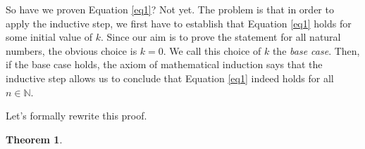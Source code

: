 \documentclass[12pt,a4paper]{article}
\newtheorem{theorem}{Theorem}[section]
\theoremstyle{definition}
\begin{document}
\bigbreak

So have we proven Equation \eqref{eq1}? Not yet. The problem is that in order to apply the inductive step, we first have to establish that Equation \eqref{eq1} holds for some initial value of $k$. Since our aim is to prove the statement for all natural numbers, the obvious choice is $k=0.$ We call this choice of $k$ the \textit{base case}. Then, if the base case holds, the axiom of mathematical induction says that the inductive step allows us to conclude that Equation \eqref{eq1} indeed holds for all $n\in\mathbb{N}$.

\bigbreak

Let's formally rewrite this proof.

\begin{theorem}

\end{theorem}
\end{document}
